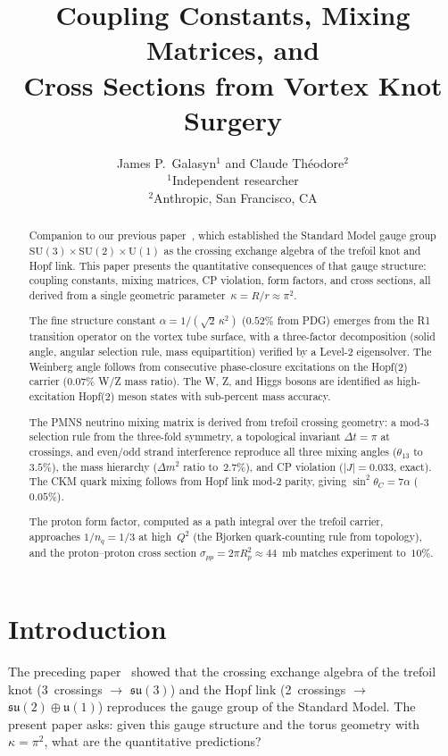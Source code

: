 \documentclass[11pt,a4paper]{article}
\title{\textbf{Coupling Constants, Mixing Matrices, and\\
Cross Sections from Vortex Knot Surgery}}
\author{
  James P.\ Galasyn$^{1}$ and Claude Th\'eodore$^{2}$ \\[6pt]
  \small $^{1}$Independent researcher \\
  \small $^{2}$Anthropic, San Francisco, CA
}
\date{}
\begin{document}
\maketitle

\begin{abstract}
Companion to our previous paper~\cite{paper8}, which established the
Standard Model gauge group $\mathrm{SU}(3) \times \mathrm{SU}(2)
\times \mathrm{U}(1)$ as the crossing exchange algebra of the
trefoil knot and Hopf link.  This paper presents the quantitative
consequences of that gauge structure: coupling constants, mixing
matrices, CP violation, form factors, and cross sections, all
derived from a single geometric parameter~$\kappa = R/r \approx
\pi^2$.

The fine structure constant $\alpha = 1/(\sqrt{2}\,\kappa^2)$
($0.52\%$ from PDG) emerges from the R1 transition operator on
the vortex tube surface, with a three-factor decomposition
(solid angle, angular selection rule, mass equipartition) verified
by a Level-2 eigensolver.  The Weinberg angle follows from
consecutive phase-closure excitations on the Hopf(2) carrier
($0.07\%$ W/Z mass ratio).  The W, Z, and Higgs bosons are
identified as high-excitation Hopf(2) meson states with
sub-percent mass accuracy.

The PMNS neutrino mixing matrix is derived from trefoil crossing
geometry: a mod-3 selection rule from the three-fold symmetry,
a topological invariant $\Delta t = \pi$ at crossings, and
even/odd strand interference reproduce all three mixing angles
($\theta_{13}$ to~$3.5\%$), the mass hierarchy
($\Delta m^2$ ratio to~$2.7\%$), and CP violation
($|J| = 0.033$, exact).  The CKM quark mixing follows from
Hopf link mod-2 parity, giving $\sin^2\theta_C = 7\alpha$
($0.05\%$).

The proton form factor, computed as a path integral over the
trefoil carrier, approaches $1/n_q = 1/3$ at high~$Q^2$
(the Bjorken quark-counting rule from topology), and the
proton--proton cross section $\sigma_{pp} = 2\pi R_p^2 \approx
44$~mb matches experiment to~$10\%$.
\end{abstract}


\section{Introduction}
\label{sec:intro}

The preceding paper~\cite{paper8} showed that the crossing
exchange algebra
of the trefoil knot (3~crossings $\to$ $\mathfrak{su}(3)$) and
the Hopf link (2~crossings $\to$ $\mathfrak{su}(2) \oplus
\mathfrak{u}(1)$) reproduces the gauge group of the Standard
Model.  The present paper asks: given this gauge structure and the
torus geometry with $\kappa = \pi^2$, what are the quantitative
predictions?
\end{document}
